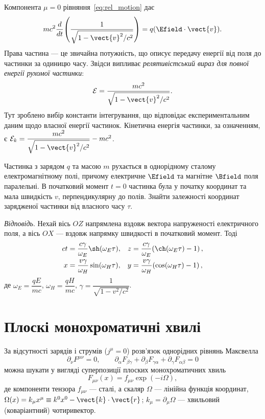 Компонента $\mu=0$ рівняння~\eqref{eq:rel_motion} дає
\begin{equation*}
    mc^2\frac{d}{dt}\!\left(\frac{1}{\sqrt{1-\vect{v}^2/c^2}}\right)
    = q(\Efield\cdot\vect{v}).
\end{equation*}
Права частина --- це звичайна потужність, що описує передачу енергії від поля до частинки за одиницю часу. Звідси випливає \emph{релятивістський вираз для повної енергії рухомої частинки}:
\begin{equation*}
    \mathcal{E} = \frac{mc^2}{\sqrt{1-\vect{v}^2/c^2}}.
\end{equation*}
Тут зроблено вибір константи інтегрування, що відповідає експериментальним даним щодо власної енергії частинок. Кінетична енергія частинки, за означенням, є $\mathcal{E}_k = \dfrac{mc^2}{\sqrt{1-\vect{v}^2/c^2}} - mc^2$.

\begin{problem}
Частинка з зарядом $q$ та масою $m$ рухається в однорідному сталому електромагнітному полі, причому електричне $\Efield$ та магнітне $\Bfield$ поля паралельні. В початковий момент $t=0$ частинка була у початку координат та мала швидкість $v$, перпендикулярну до полів. Знайти залежності координат зарядженої частинки від власного часу $\tau$.

\textit{Відповідь}. Нехай вісь $OZ$ напрямлена вздовж вектора напруженості електричного поля, а вісь $OX$ --- вздовж напрямку швидкості в початковий момент. Тоді
\begin{align*}
    ct &= \frac{c\gamma}{\omega_E}\sh(\omega_E\tau),
    &z &= \frac{c\gamma}{\omega_E}\!\left(\ch(\omega_E\tau)-1\right), \\
    x &= \frac{v\gamma}{\omega_H}\sin(\omega_H\tau),
    &y &= \frac{v\gamma}{\omega_H}\!\left(\cos(\omega_H\tau)-1\right),
\end{align*}
де $\omega_E = \dfrac{qE}{mc}$, $\omega_H = \dfrac{qH}{mc}$, $\gamma = \dfrac{1}{\sqrt{1-v^2/c^2}}$.
\end{problem}

\section{Плоскі монохроматичні хвилі}

За відсутності зарядів і струмів ($j^{\mu}=0$) розв'язок однорідних рівнянь Максвелла
\begin{equation*}
    \partial_{\nu}F^{\mu\nu} = 0, \qquad
    \partial_{\alpha}F_{\beta\gamma}
    + \partial_{\beta}F_{\gamma\alpha}
    + \partial_{\gamma}F_{\alpha\beta} = 0
\end{equation*}
можна шукати у вигляді суперпозиції плоских монохроматичних хвиль
\begin{equation*}
    F_{\mu\nu}(x) = f_{\mu\nu}\exp(-i\Omega),
\end{equation*}
де компоненти тензора $f_{\mu\nu}$ --- сталі, а скаляр $\Omega$ --- лінійна функція координат, $\Omega(x)=k_{\mu}x^{\mu}\equiv k^0x^0 - \vect{k}\cdot\vect{r}$; $k_{\mu}=\partial_{\mu}\Omega$ --- хвильовий (коваріантний) чотиривектор.

